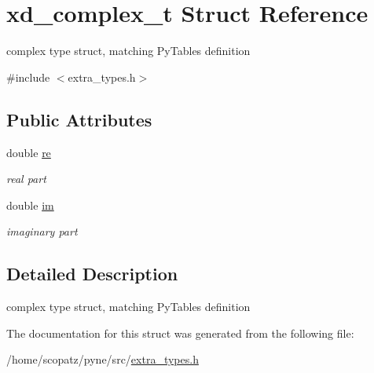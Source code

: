 \hypertarget{structxd__complex__t}{\section{xd\-\_\-complex\-\_\-t Struct Reference}
\label{structxd__complex__t}
}


complex type struct, matching Py\-Tables definition  




{\ttfamily \#include $<$extra\-\_\-types.\-h$>$}

\subsection*{Public Attributes}
\begin{DoxyCompactItemize}
\item 
\hypertarget{structxd__complex__t_afbbb6ed1fe3b729258421cb3eaa8c4d8}{double \hyperlink{structxd__complex__t_afbbb6ed1fe3b729258421cb3eaa8c4d8}{re}}\label{structxd__complex__t_afbbb6ed1fe3b729258421cb3eaa8c4d8}

\begin{DoxyCompactList}\small\item\em real part \end{DoxyCompactList}\item 
\hypertarget{structxd__complex__t_afb1d09ccfa0e10044572c8a7bf4806f2}{double \hyperlink{structxd__complex__t_afb1d09ccfa0e10044572c8a7bf4806f2}{im}}\label{structxd__complex__t_afb1d09ccfa0e10044572c8a7bf4806f2}

\begin{DoxyCompactList}\small\item\em imaginary part \end{DoxyCompactList}\end{DoxyCompactItemize}


\subsection{Detailed Description}
complex type struct, matching Py\-Tables definition 

The documentation for this struct was generated from the following file\-:\begin{DoxyCompactItemize}
\item 
/home/scopatz/pyne/src/\hyperlink{extra__types_8h}{extra\-\_\-types.\-h}\end{DoxyCompactItemize}

